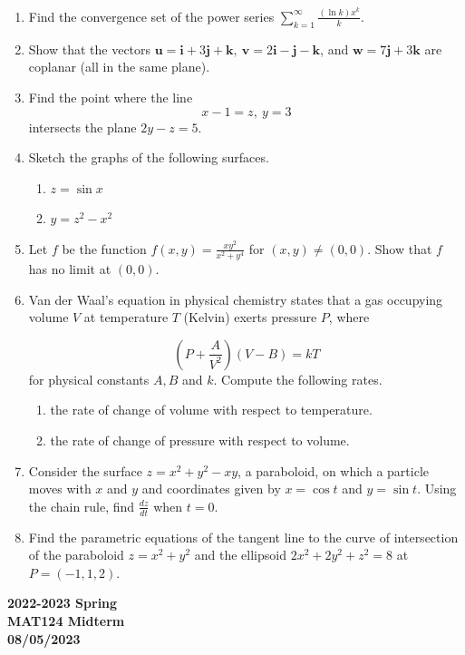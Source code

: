 \documentclass[a4paper, 12pt]{article}
\begin{document}
\begin{enumerate}[leftmargin=*,label=\textbf{\arabic*.}]
\item Find the convergence set of the power series $\displaystyle\sum_{k=1}^\infty\frac{(\ln k)x^k}k$.

\item Show that the vectors $\mathbf{u}=\mathbf{i}+3\mathbf{j}+\mathbf{k},\:\mathbf{v}=2\mathbf{i}-\mathbf{j}-\mathbf{k}$, and $\mathbf{w}=7\mathbf{j}+3\mathbf{k}$ are coplanar (all in the same plane).

\item Find the point where the line
\[x-1=z,\:y=3\]
intersects the plane $2y-z=5$.

\item Sketch the graphs of the following surfaces.

\begin{enumerate}[leftmargin=*,label=\textbf{\alph*.}]
\item $z=\sin x$
\item $y=z^2-x^2$
\end{enumerate}

\item Let $f$ be the function $\displaystyle f(x,y)=\frac{xy^2}{x^2+y^4}$ for $(x,y)\neq(0,0)$. Show that $f$ has no limit at $(0,0)$.

\item Van der Waal's equation in physical chemistry states that a gas occupying volume $V$ at temperature $T$ (Kelvin) exerts pressure $P$, where

\[\left(P+\frac A{V^2}\right)(V-B)=kT\]
for physical constants $A, B$ and $k$. Compute the following rates.

\begin{enumerate}[leftmargin=*,label=\textbf{\alph*.}]
\item the rate of change of volume with respect to temperature.
\item the rate of change of pressure with respect to volume.
\end{enumerate}

\item Consider the surface $z=x^2+y^2-xy$, a paraboloid, on which a particle moves with $x$ and $y$ and coordinates given by $x=\cos t$ and $y=\sin t$. Using the chain rule, find $\displaystyle\frac{dz}{dt}$ when $t=0$. 

\item Find the parametric equations of the tangent line to the curve of intersection of the paraboloid $z=x^2+y^2$ and the ellipsoid $2x^2+2y^2+z^2=8$ at $P=(-1,1,2)$.
\end{enumerate}
\newpage
{}
{}
\begin{center}
\textbf{2022-2023 Spring \\MAT124 Midterm\\08/05/2023}
\end{center}
\end{document}
